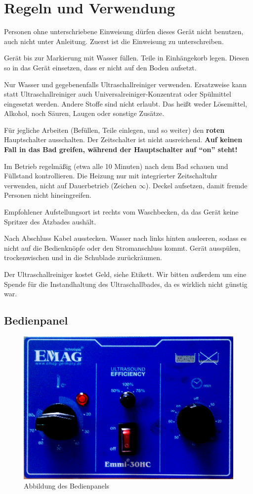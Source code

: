 \documentclass{\basedir/fablab-document}
\begin{document}
\section{Regeln und Verwendung}
Personen ohne unterschriebene Einweisung dürfen dieses Gerät nicht benutzen, auch nicht unter Anleitung.
Zuerst ist die Einweisung zu unterschreiben.

Gerät bis zur Markierung mit Wasser füllen.
Teile in Einhängekorb legen.
Diesen so in das Gerät einsetzen, dass er nicht auf den Boden aufsetzt.

Nur Wasser und gegebenenfalls Ultraschallreiniger verwenden.
Ersatzweise kann statt Ultraschallreiniger auch Universalreiniger-Konzentrat oder Spülmittel eingesetzt werden.
Andere Stoffe sind nicht erlaubt.
Das heißt weder Lösemittel, Alkohol, noch Säuren, Laugen oder sonstige Zusätze.

Für jegliche Arbeiten (Befüllen, Teile einlegen, und so weiter) den \textbf{roten} Hauptschalter ausschalten.
Der Zeitschalter ist nicht ausreichend.
\textbf{Auf keinen Fall in das Bad greifen, während der Hauptschalter auf \enquote{on} steht!}

Im Betrieb regelmäßig (etwa alle 10 Minuten) nach dem Bad schauen und Füllstand kontrollieren.
Die Heizung nur mit integrierter Zeitschaltuhr verwenden, nicht auf Dauerbetrieb (Zeichen $\infty$).
Deckel aufsetzen, damit fremde Personen nicht hineingreifen.

Empfohlener Aufstellungsort ist rechts vom Waschbecken, da das Gerät keine Spritzer des Ätzbades aushält.

Nach Abschluss Kabel ausstecken.
Wasser nach links hinten ausleeren, sodass es nicht auf die Bedienknöpfe oder den Stromanschluss kommt.
Gerät ausspülen, trockenwischen und in die Schublade zurückräumen.

Der Ultraschallreiniger kostet Geld, siehe Etikett.
Wir bitten außerdem um eine Spende für die Instandhaltung des Ultraschallbades, da es wirklich nicht günstig war.

\subsection{Bedienpanel}

\begin{figure}
\centering
\includegraphics[width=0.6\linewidth]{img/frontpanel.png}
\caption[Abbildung des Bedienpanels]{Abbildung des Bedienpanels}
\end{figure}
\end{document}
